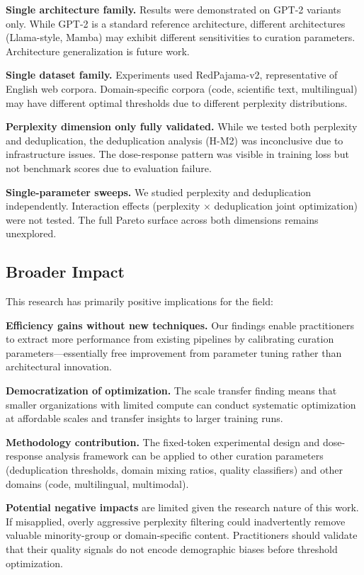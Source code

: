 \textbf{Single architecture family.} Results were demonstrated on GPT-2 variants only. While GPT-2 is a standard reference architecture, different architectures (Llama-style, Mamba) may exhibit different sensitivities to curation parameters. Architecture generalization is future work.

\textbf{Single dataset family.} Experiments used RedPajama-v2, representative of English web corpora. Domain-specific corpora (code, scientific text, multilingual) may have different optimal thresholds due to different perplexity distributions.

\textbf{Perplexity dimension only fully validated.} While we tested both perplexity and deduplication, the deduplication analysis (H-M2) was inconclusive due to infrastructure issues. The dose-response pattern was visible in training loss but not benchmark scores due to evaluation failure.

\textbf{Single-parameter sweeps.} We studied perplexity and deduplication independently. Interaction effects (perplexity $\times$ deduplication joint optimization) were not tested. The full Pareto surface across both dimensions remains unexplored.

\subsection{Broader Impact}

This research has primarily positive implications for the field:

\textbf{Efficiency gains without new techniques.} Our findings enable practitioners to extract more performance from existing pipelines by calibrating curation parameters---essentially free improvement from parameter tuning rather than architectural innovation.

\textbf{Democratization of optimization.} The scale transfer finding means that smaller organizations with limited compute can conduct systematic optimization at affordable scales and transfer insights to larger training runs.

\textbf{Methodology contribution.} The fixed-token experimental design and dose-response analysis framework can be applied to other curation parameters (deduplication thresholds, domain mixing ratios, quality classifiers) and other domains (code, multilingual, multimodal).

\textbf{Potential negative impacts} are limited given the research nature of this work. If misapplied, overly aggressive perplexity filtering could inadvertently remove valuable minority-group or domain-specific content. Practitioners should validate that their quality signals do not encode demographic biases before threshold optimization.

